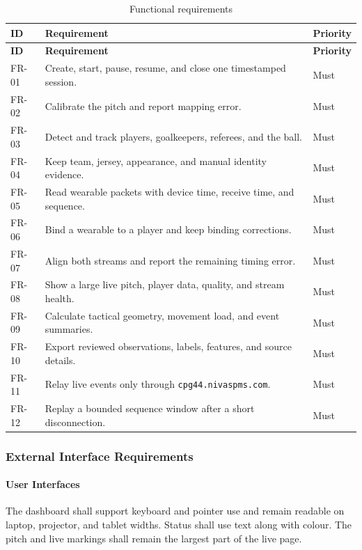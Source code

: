 \begin{longtable}{@{}p{0.65in}p{4.55in}p{0.65in}@{}}
\caption{Functional requirements}\label{tab:functional_requirements}\\
\toprule
\textbf{ID} & \textbf{Requirement} & \textbf{Priority}\\
\midrule
\endfirsthead
\toprule
\textbf{ID} & \textbf{Requirement} & \textbf{Priority}\\
\midrule
\endhead
FR-01 & Create, start, pause, resume, and close one timestamped session. & Must\\
FR-02 & Calibrate the pitch and report mapping error. & Must\\
FR-03 & Detect and track players, goalkeepers, referees, and the ball. & Must\\
FR-04 & Keep team, jersey, appearance, and manual identity evidence. & Must\\
FR-05 & Read wearable packets with device time, receive time, and sequence. & Must\\
FR-06 & Bind a wearable to a player and keep binding corrections. & Must\\
FR-07 & Align both streams and report the remaining timing error. & Must\\
FR-08 & Show a large live pitch, player data, quality, and stream health. & Must\\
FR-09 & Calculate tactical geometry, movement load, and event summaries. & Must\\
FR-10 & Export reviewed observations, labels, features, and source details. & Must\\
FR-11 & Relay live events only through \texttt{cpg44.nivaspms.com}. & Must\\
FR-12 & Replay a bounded sequence window after a short disconnection. & Must\\
\bottomrule
\end{longtable}

\subsubsection{External Interface Requirements}

\paragraph{User Interfaces}
The dashboard shall support keyboard and pointer use and remain readable on
laptop, projector, and tablet widths. Status shall use text along with colour.
The pitch and live markings shall remain the largest part of the live page.

